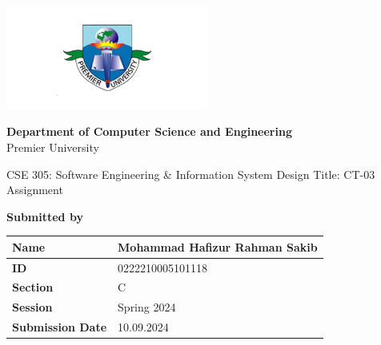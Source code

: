 \documentclass{scrreprt}
\renewcommand{\arraystretch}{1.5} %
\begin{document}
\begin{titlepage}
    \centering
    \begin{center}
        \includegraphics[width=0.5\textwidth]{logo.png} %
    \end{center}
\begin{center}
    \textbf{Department of Computer Science and Engineering}\\
    Premier University
\end{center}
\begin{center}
    \huge \textnormal{CSE 305: Software Engineering \& Information System 
                     Design}
    \vspace{1in} %
    \newline
    \Large \textnormal{Title: CT-03 Assignment}
    \vspace{0.5in} %
\end{center}

    \large
    \textbf {Submitted by}\\
   \begin{center}
\renewcommand{\arraystretch}{1.5} %
\begin{tabular}{|p{}|p{}|} %
\hline
\textbf{Name} & Mohammad Hafizur Rahman Sakib \\
\hline
\textbf{ID} & 0222210005101118 \\
\hline
\textbf{Section} & C \\
\hline
\textbf{Session} & Spring 2024 \\
\hline
\textbf{Submission Date} & 10.09.2024 \\
\hline
\end{tabular}
\end{center}

    \vspace{0.5in}
 

\end{titlepage}
\end{document}
